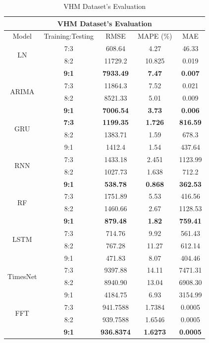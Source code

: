 \documentclass{ieeeojies}
\begin{document}
  \begin{table}[H]
    \centering
    \begin{tabular}{|c|c|c|c|c|}
           \hline
           \multicolumn{5}{|c|}{\textbf{VHM Dataset's Evaluation}}\\
           \hline
           \centering Model & Training:Testing & RMSE & MAPE (\%) & MAE\\
           \hline
           \multirow{2}{*}{LN} & 7:3 & 608.64 & 4.27 & 46.33 \\ & 8:2 & 11729.2 & 10.825 & 0.019 \\ & \textbf{9:1} & \textbf{7933.49} & \textbf{7.47} & \textbf{0.007}\\
           \hline
           \multirow{2}{*}{ARIMA} & 7:3&11864.3&7.52&0.021\\ & 8:2&8521.33&5.01&0.009 \\ & \textbf{9:1} & \textbf{7006.54} & \textbf{3.73} & \textbf{0.006}\\
           \hline
           \multirow{2}{*}{GRU} & \textbf{7:3} & \textbf{1199.35} & \textbf{1.726} & \textbf{816.59} \\ & 8:2 &  1383.71 & 1.59 &678.3 \\ & 9:1 & 1412.4	&1.54&437.64\\
           \hline
           \multirow{2}{*}{RNN} & 7:3 &  1433.18 &  2.451 & 1123.99 \\ & 8:2 &  1027.73 & 1.638 &  712.2\\ & \textbf{9:1} & \textbf{538.78} & \textbf{0.868} & \textbf{362.53} \\
           \hline
           \multirow{2}{*}{RF} & 7:3	& 1751.89 & 5.53 &  416.56 \\ & 8:2 & 1460.66 & 2.67 & 1128.53 \\ & \textbf{9:1} & \textbf{879.48} & \textbf{1.82} & \textbf{759.41}\\
           \hline
           \multirow{2}{*}{LSTM} & 7:3 & 714.76 & 9.92 & 561.43 \\ & 8:2 & 767.28 & 11.27 & 612.14 \\ & 9:1 & 471.83	&8.07&404.46\\
           \hline
           \multirow{2}{*}{TimesNet} & 7:3 & 9397.88 & 14.11 & 7471.31 \\ & 8:2 & 8940.90 & 13.04 & 6908.30 \\ & 9:1 & 4184.75	& 6.93 &3154.99\\
           \hline
           \multirow{2}{*}{FFT} & 7:3 & 941.7588 &  1.7384 &  0.0005 \\ & 8:2 & 939.7588 &  1.6546 &  0.0005 \\ & \textbf{9:1} & \textbf{936.8374} & \textbf{1.6273} & \textbf{0.0005}\\
           \hline
      \end{tabular}
      \caption{VHM Dataset's Evaluation}
      \label{vcbresult}
  \end{table}
\end{document}

